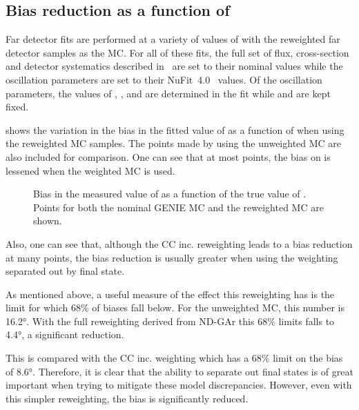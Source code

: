\subsection{Bias reduction as a function of \dcp}
\label{sec:dune_ndrwt:rwt:biasReduction}

Far detector fits are performed at a variety of values of \dcp with the reweighted far detector samples as the MC.
For all of these fits, the full set of flux, cross-section and detector systematics described in~\cite{Abi:2020qib} are set to their nominal values while the oscillation parameters are set to their NuFit~4.0~\cite{nufit4} values.
Of the oscillation parameters, the values of , ,  and \dcp are determined in the fit while  and  are kept fixed.

 shows the variation in the bias in the fitted value of \dcp as a function of \dcpTrue when using the reweighted MC samples.
The points made by using the unweighted MC are also included for comparison.
One can see that at most points, the bias on \dcp is lessened when the weighted MC is used.

\begin{figure}[h]
	\begin{adjustbox}{max totalsize=.6\linewidth, center}
		
	\end{adjustbox}
	\caption[Bias in fit value of \dcp with ND-GAr reweighted MC]{Bias in the measured value of \dcp as a function of the true value of \dcp. Points for both the nominal GENIE MC and the reweighted MC are shown.}
	\label{fig:dcpBiasWithWgt}
\end{figure}

Also, one can see that, although the CC inc. reweighting leads to a bias reduction at many points, the bias reduction is usually greater when using the weighting separated out by final state.

As mentioned above, a useful measure of the effect this reweighting has is the limit for which 68\% of biases fall below.
For the unweighted MC, this number is \ang{16.2}. 
With the full reweighting derived from ND-GAr this 68\% limits falls to \ang{4.4}, a significant reduction.

This is compared with the CC inc. weighting which has a 68\% limit on the \dcp bias of \ang{8.6}.
Therefore, it is clear that the ability to separate out final states is of great important when trying to mitigate these model discrepancies.
However, even with this simpler reweighting, the bias is significantly reduced.

